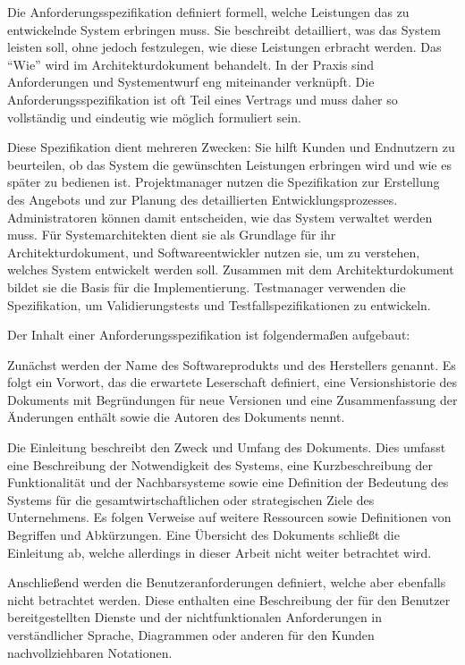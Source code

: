 Die Anforderungsspezifikation definiert formell, welche Leistungen das zu entwickelnde System erbringen muss. Sie 
beschreibt detailliert, was das System leisten soll, ohne jedoch festzulegen, wie diese Leistungen erbracht werden. 
Das ``Wie'' wird im Architekturdokument behandelt. In der Praxis sind Anforderungen und Systementwurf eng miteinander 
verknüpft. Die Anforderungsspezifikation ist oft Teil eines Vertrags und muss daher so vollständig und eindeutig wie 
möglich formuliert sein.

Diese Spezifikation dient mehreren Zwecken: Sie hilft Kunden und Endnutzern zu beurteilen, ob das System die 
gewünschten Leistungen erbringen wird und wie es später zu bedienen ist. Projektmanager nutzen die Spezifikation 
zur Erstellung des Angebots und zur Planung des detaillierten Entwicklungsprozesses. Administratoren können damit 
entscheiden, wie das System verwaltet werden muss. Für Systemarchitekten dient sie als Grundlage für ihr 
Architekturdokument, und Softwareentwickler nutzen sie, um zu verstehen, welches System entwickelt werden soll. 
Zusammen mit dem Architekturdokument bildet sie die Basis für die Implementierung. Testmanager verwenden die 
Spezifikation, um Validierungstests und Testfallspezifikationen zu entwickeln.

Der Inhalt einer Anforderungsspezifikation ist folgendermaßen aufgebaut:

Zunächst werden der Name des Softwareprodukts und des Herstellers genannt. Es folgt ein Vorwort, das die erwartete 
Leserschaft definiert, eine Versionshistorie des Dokuments mit Begründungen für neue Versionen und eine Zusammenfassung 
der Änderungen enthält sowie die Autoren des Dokuments nennt.

Die Einleitung beschreibt den Zweck und Umfang des Dokuments. Dies umfasst eine Beschreibung der Notwendigkeit des 
Systems, eine Kurzbeschreibung der Funktionalität und der Nachbarsysteme sowie eine Definition der Bedeutung des 
Systems für die gesamtwirtschaftlichen oder strategischen Ziele des Unternehmens. Es folgen Verweise auf weitere 
Ressourcen sowie Definitionen von Begriffen und Abkürzungen. Eine Übersicht des Dokuments schließt die Einleitung ab, 
welche allerdings in dieser Arbeit nicht weiter betrachtet wird.

Anschließend werden die Benutzeranforderungen definiert, welche aber ebenfalls nicht betrachtet werden. 
Diese enthalten eine Beschreibung der für den Benutzer bereitgestellten Dienste und der nichtfunktionalen 
Anforderungen in verständlicher Sprache, Diagrammen oder anderen für den Kunden nachvollziehbaren Notationen.

